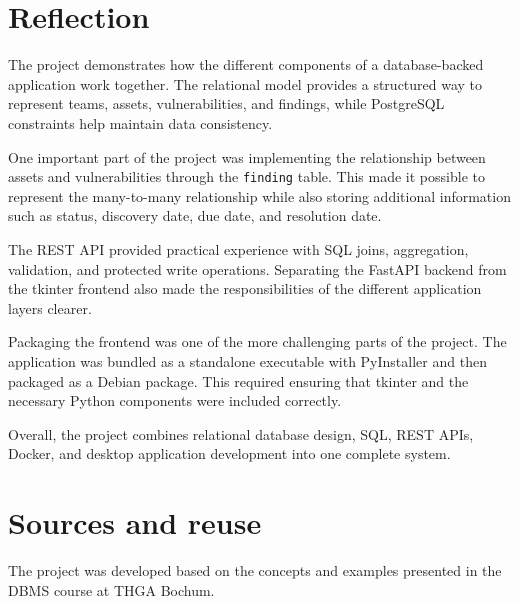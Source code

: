 \documentclass[11pt,a4paper]{article}
\begin{document}
\section{Reflection}

The project demonstrates how the different components of a database-backed
application work together. The relational model provides a structured way to
represent teams, assets, vulnerabilities, and findings, while PostgreSQL
constraints help maintain data consistency.

One important part of the project was implementing the relationship between
assets and vulnerabilities through the \texttt{finding} table. This made it
possible to represent the many-to-many relationship while also storing
additional information such as status, discovery date, due date, and
resolution date.

The REST API provided practical experience with SQL joins, aggregation,
validation, and protected write operations. Separating the FastAPI backend
from the tkinter frontend also made the responsibilities of the different
application layers clearer.

Packaging the frontend was one of the more challenging parts of the project.
The application was bundled as a standalone executable with PyInstaller and
then packaged as a Debian package. This required ensuring that tkinter and the
necessary Python components were included correctly.

Overall, the project combines relational database design, SQL, REST APIs,
Docker, and desktop application development into one complete system.

\section*{Sources and reuse}

The project was developed based on the concepts and examples presented in the
DBMS course at THGA Bochum.
\end{document}
